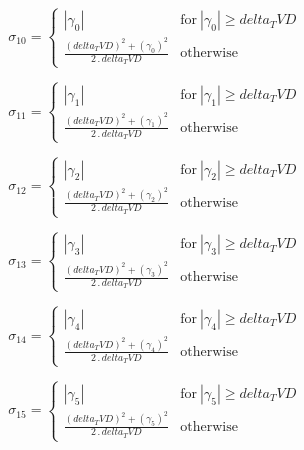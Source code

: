 \documentclass{article}
\begin{document}
\begin{dmath}\sigma_{1 0} = \begin{cases} \left|{\gamma_{0}}\right| & \text{for}\: \left|{\gamma_{0}}\right| \geq delta_TVD \\\frac{\left(delta_TVD \right)^{2} + \left(\gamma_{0} \right)^{2}}{2 \,.\, delta_TVD} & \text{otherwise} 
\end{cases}\end{dmath}

\begin{dmath}\sigma_{1 1} = \begin{cases} \left|{\gamma_{1}}\right| & \text{for}\: \left|{\gamma_{1}}\right| \geq delta_TVD \\\frac{\left(delta_TVD \right)^{2} + \left(\gamma_{1} \right)^{2}}{2 \,.\, delta_TVD} & \text{otherwise} 
\end{cases}\end{dmath}

\begin{dmath}\sigma_{1 2} = \begin{cases} \left|{\gamma_{2}}\right| & \text{for}\: \left|{\gamma_{2}}\right| \geq delta_TVD \\\frac{\left(delta_TVD \right)^{2} + \left(\gamma_{2} \right)^{2}}{2 \,.\, delta_TVD} & \text{otherwise} 
\end{cases}\end{dmath}

\begin{dmath}\sigma_{1 3} = \begin{cases} \left|{\gamma_{3}}\right| & \text{for}\: \left|{\gamma_{3}}\right| \geq delta_TVD \\\frac{\left(delta_TVD \right)^{2} + \left(\gamma_{3} \right)^{2}}{2 \,.\, delta_TVD} & \text{otherwise} 
\end{cases}\end{dmath}

\begin{dmath}\sigma_{1 4} = \begin{cases} \left|{\gamma_{4}}\right| & \text{for}\: \left|{\gamma_{4}}\right| \geq delta_TVD \\\frac{\left(delta_TVD \right)^{2} + \left(\gamma_{4} \right)^{2}}{2 \,.\, delta_TVD} & \text{otherwise} 
\end{cases}\end{dmath}

\begin{dmath}\sigma_{1 5} = \begin{cases} \left|{\gamma_{5}}\right| & \text{for}\: \left|{\gamma_{5}}\right| \geq delta_TVD \\\frac{\left(delta_TVD \right)^{2} + \left(\gamma_{5} \right)^{2}}{2 \,.\, delta_TVD} & \text{otherwise} 
\end{cases}\end{dmath}
\end{document}
